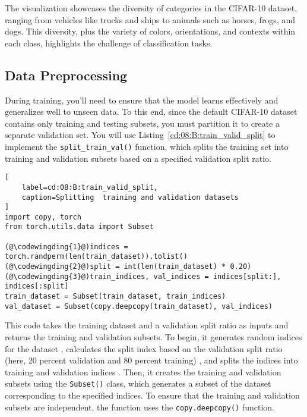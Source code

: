 The visualization showcases the diversity of categories in the CIFAR-10 dataset, ranging from vehicles like trucks and ships to animals such as horses, frogs, and dogs. This diversity, plus the variety of colors, orientations, and contexts within each class, highlights the challenge of classification tasks.

\subsection{Data Preprocessing}

During training, you'll need to ensure that the model learns effectively and generalizes well to unseen data. To this end, since the default CIFAR-10 dataset contains only training and testing subsets, you must partition it to create a separate validation set. You will use Listing~\ref{cd:08:B:train_valid_split} to implement the \lstinline{split_train_val()} function, which splits the training set into training and validation subsets based on a specified validation split ratio.
\begin{lstlisting}[
    label=cd:08:B:train_valid_split,
    caption=Splitting  training and validation datasets
]
import copy, torch
from torch.utils.data import Subset

(@\codewingding{1}@)indices = torch.randperm(len(train_dataset)).tolist()
(@\codewingding{2}@)split = int(len(train_dataset) * 0.20)
(@\codewingding{3}@)train_indices, val_indices = indices[split:], indices[:split]
train_dataset = Subset(train_dataset, train_indices)
val_dataset = Subset(copy.deepcopy(train_dataset), val_indices)
\end{lstlisting}
This code takes the training dataset and a validation split ratio as inputs and returns the training and validation subsets. To begin, it generates random indices for the dataset , calculates the split index based on the validation split ratio (here, 20 percent validation and 80 percent training) , and splits the indices into training and validation indices . Then, it creates the training and validation subsets using the \lstinline{Subset()} class, which generates a subset of the dataset corresponding to the specified indices. To ensure that the training and validation subsets are independent, the function uses the \lstinline{copy.deepcopy()} function.

